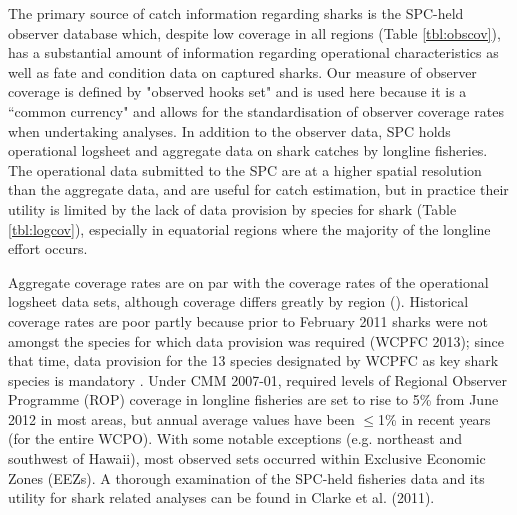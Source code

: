 \documentclass[12pt]{SCreport}
\begin{document}
The primary source of catch information regarding sharks is the SPC-held observer database which, despite low coverage in all regions (Table \ref{tbl:obscov}), has a substantial amount of information regarding operational characteristics as well as fate and condition data on captured sharks. Our measure of observer coverage is defined by "observed hooks set" and is used here because it is a ``common currency" and allows for the standardisation of observer coverage rates when undertaking analyses.  In addition to the observer data, SPC holds operational logsheet and aggregate data on shark catches by longline fisheries. The operational data submitted to the SPC are at a higher spatial resolution than the aggregate data, and are useful for catch estimation, but in practice their utility is limited by the lack of data provision by species for shark (Table \ref{tbl:logcov}), especially in equatorial regions where the majority of the longline effort occurs. 

Aggregate coverage rates are on par with the coverage rates of the operational logsheet data sets, although coverage differs greatly by region (). Historical coverage rates are poor partly because prior to February 2011 sharks were not amongst the species for which data provision was required (WCPFC 2013); since that time, data provision for the 13 species designated by WCPFC as key shark species is mandatory . Under CMM 2007-01, required levels of Regional Observer Programme (ROP) coverage in longline fisheries are set to rise to 5\% from June 2012 in most areas, but annual average values have been $\leq$1\% in recent years (for the entire WCPO). With some notable exceptions (e.g. northeast and southwest of Hawaii), most observed sets occurred within Exclusive Economic Zones (EEZs). A thorough examination of the SPC-held fisheries data and its utility for shark related analyses can be found in Clarke et al. (2011).
\end{document}
